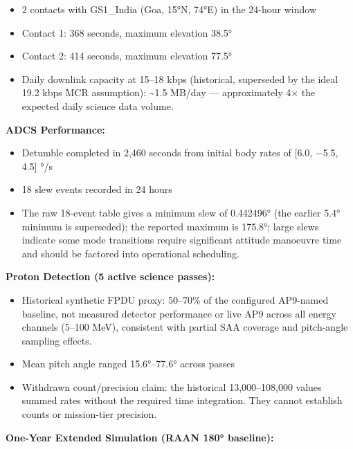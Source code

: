 \begin{itemize}
\item
  2 contacts with GS1\_India (Goa, 15°N, 74°E) in the 24-hour window
\item
  Contact 1: 368 seconds, maximum elevation 38.5°
\item
  Contact 2: 414 seconds, maximum elevation 77.5°
\item
  Daily downlink capacity at 15--18 kbps (historical, superseded by the ideal 19.2 kbps MCR assumption): \textasciitilde1.5 MB/day ---
  approximately 4× the expected daily science data volume.
\end{itemize}

\textbf{ADCS Performance:}

\begin{itemize}
\item
  Detumble completed in 2,460 seconds from initial body rates of {[}6.0,
  −5.5, 4.5{]} °/s
\item
  18 slew events recorded in 24 hours
\item
  The raw 18-event table gives a minimum slew of 0.442496° (the earlier 5.4° minimum is superseded); the reported maximum is 175.8°; large slews indicate some mode
  transitions require significant attitude manoeuvre time and should be
  factored into operational scheduling.
\end{itemize}

\textbf{Proton Detection (5 active science passes):}

\begin{itemize}
\item
  Historical synthetic FPDU proxy: 50--70\% of the configured AP9-named baseline, not measured detector performance or live AP9
  across all energy channels (5--100 MeV), consistent with partial SAA
  coverage and pitch-angle sampling effects.
\item
  Mean pitch angle ranged 15.6°--77.6° across passes
\item
  Withdrawn count/precision claim: the historical 13,000--108,000 values summed rates without the required time integration. They cannot establish counts or mission-tier precision.
\end{itemize}

\textbf{One-Year Extended Simulation (RAAN 180° baseline):}

